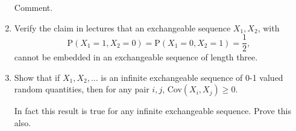 \documentclass[12pt]{article}
\def\P{\mbox{P}}
\begin{document}
\begin{enumerate}
Comment.




\item  Verify the claim in lectures that an exchangeable sequence $X_1, X_2$,
 with
$$
\P(X_1=1, X_2=0) = \P(X_1=0, X_2=1) = \frac{1}{2},
$$
cannot be embedded in an exchangeable sequence of length three.


\item   Show that if  $X_1, X_2, \ldots$ is an infinite exchangeable
sequence of 0-1 valued random quantities, then for any pair $i,j$,
Cov$(X_i, X_j) \ge 0$.  

In fact this result is true for any infinite exchangeable sequence. 
Prove this also.


 
\end{enumerate}
\end{document}
